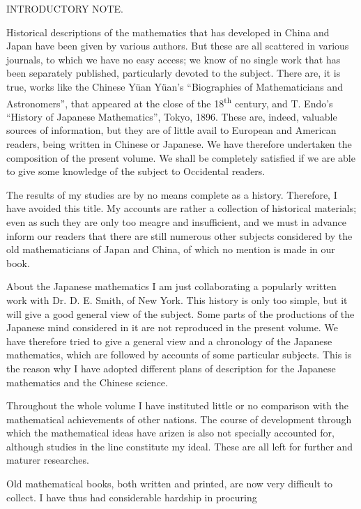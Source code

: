 \documentclass[11pt]{article}
\newcommand{\scanpage}[2]{\clearpage\setcounter{footnote}{0}\noindent{\footnotesize\color{gray}PDF page #1 · #2}\par\medskip}
\newcommand{\scanfooter}{}
\begin{document}
\scanpage{0010}{Introductory Note, first page}
\begin{center}{\Large INTRODUCTORY NOTE.}\end{center}

Historical descriptions of the mathematics that has developed in China and Japan have been given by various authors. But these are all scattered in various journals, to which we have no easy access; we know of no single work that has been separately published, particularly devoted to the subject. There are, it is true, works like the Chinese Yüan Yüan's ``Biographies of Mathematicians and Astronomers'', that appeared at the close of the 18\textsuperscript{th} century, and T. Endo's ``History of Japanese Mathematics'', Tokyo, 1896. These are, indeed, valuable sources of information, but they are of little avail to European and American readers, being written in Chinese or Japanese. We have therefore undertaken the composition of the present volume. We shall be completely satisfied if we are able to give some knowledge of the subject to Occidental readers.

The results of my studies are by no means complete as a history. Therefore, I have avoided this title. My accounts are rather a collection of historical materials; even as such they are only too meagre and insufficient, and we must in advance inform our readers that there are still numerous other subjects considered by the old mathematicians of Japan and China, of which no mention is made in our book.

About the Japanese mathematics I am just collaborating a popularly written work with Dr. D. E. Smith, of New York. This history is only too simple, but it will give a good general view of the subject. Some parts of the productions of the Japanese mind considered in it are not reproduced in the present volume. We have therefore tried to give a general view and a chronology of the Japanese mathematics, which are followed by accounts of some particular subjects. This is the reason why I have adopted different plans of description for the Japanese mathematics and the Chinese science.

Throughout the whole volume I have instituted little or no comparison with the mathematical achievements of other nations. The course of development through which the mathematical ideas have arizen is also not specially accounted for, although studies in the line constitute my ideal. These are all left for further and maturer researches.

Old mathematical books, both written and printed, are now very difficult to collect. I have thus had considerable hardship in procuring
\scanfooter
\end{document}
